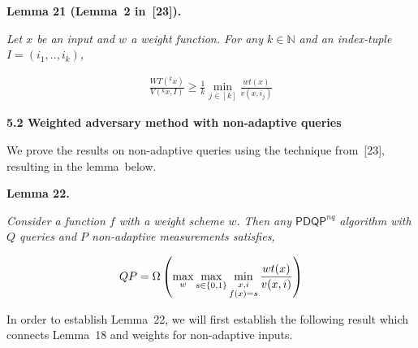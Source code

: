 

\par\medskip\noindent\textbf{
\textbf{Lemma 21}\textbf{ }(Lemma 2 in [23])\textbf{.}
}\par



\emph{Let $x$ be an input and $w$ a weight function. For any $k\in\mathbb{N}$ and an index-tuple $I=(i_{1},..,i_{k})$,}\par


\[\begin{gathered}
\displaystyle\frac{WT({}^{k}x)}{V({}^{k}x,I)}\geq\frac{1}{k}\min_{j\in[k]}\frac{wt(x)}{v(x,i_{j})}
\end{gathered}\]







\par\medskip\noindent\textbf{
5.2 Weighted adversary method with non-adaptive queries}\par




We prove the results on non-adaptive queries using the technique from [23], resulting in the lemma below.\par





\par\medskip\noindent\textbf{
\textbf{Lemma 22}\textbf{.}
}\par



\emph{Consider a function $f$ with a weight scheme $w$. Then any $\mathsf{PDQP}^{nq}$ algorithm with $Q$ queries and $P$ non-adaptive measurements satisfies,}\par


\[\begin{gathered}
\displaystyle QP=\Omega\left(\max_{w}\max_{s\in\{0,1\}}\min_{\begin{subarray}{c}x,i\\
f(x)=s\end{subarray}}\frac{wt(x)}{v(x,i)}\right)
\end{gathered}\]






In order to establish Lemma 22, we will first establish the following result which connects Lemma 18 and weights for non-adaptive inputs.\par



